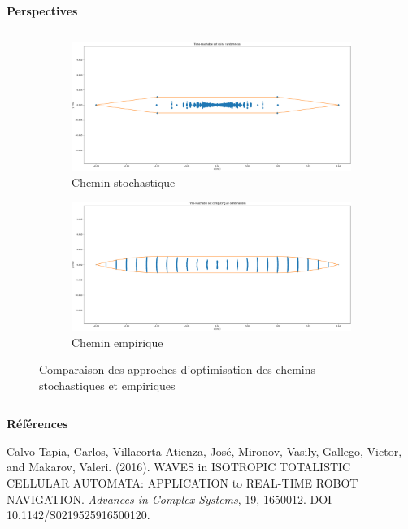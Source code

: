 \documentclass[aspectratio=169,10pt]{beamer}
\begin{document}
\begin{frame}{\textbf{Perspectives}}
\begin{columns}[t]
\begin{column}{0.45\textwidth}
            \begin{figure}[H]
                \centering
                \begin{subfigure}[b]{0.48\textwidth}
                    \includegraphics[width=\textwidth]{IMAGES/random.png}
                    \caption{Chemin stochastique}
                \end{subfigure}
                \hfill
                \begin{subfigure}[b]{0.48\textwidth}
                    \includegraphics[width=\textwidth]{IMAGES/empiric.png}
                    \caption{Chemin empirique}
                \end{subfigure}
                \caption{Comparaison des approches d'optimisation des chemins stochastiques et empiriques}
            \end{figure}
        \end{column}
    \end{columns}
\end{frame}

\begin{frame}{\textbf{Références}}
	\scriptsize
	\begin{thebibliography}{9}

	Calvo Tapia, Carlos, Villacorta-Atienza, José, Mironov, Vasily, Gallego, Victor, and Makarov, Valeri. (2016). WAVES in ISOTROPIC TOTALISTIC CELLULAR AUTOMATA: APPLICATION to REAL-TIME ROBOT NAVIGATION. \textit{Advances in Complex Systems}, 19, 1650012. DOI 10.1142/S0219525916500120.

	\end{thebibliography}

\end{frame}
\end{document}

